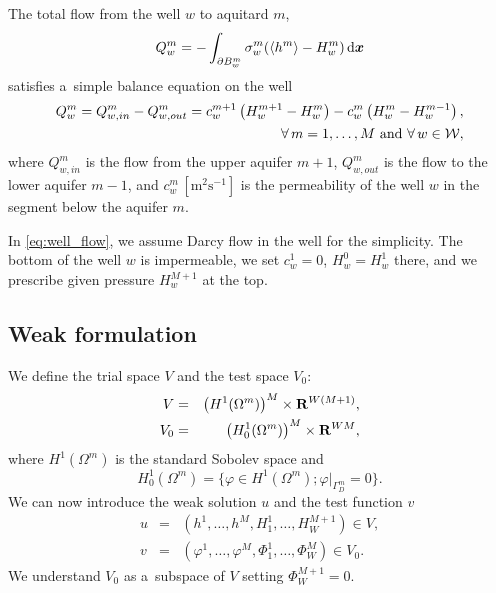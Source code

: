 \documentclass[dvipsnames,FM,Dis]{tulthesis}
\begin{document}
The total flow from the well $w$ to aquitard $m$,
\[
    Q^m_w =-\int_{\partial B^m_w} \sigma^m_w(\langle h^m \rangle - H^m_w)  \,{\rm d}\mathbf{\boldsymbol{x}}
\]
satisfies a~simple balance equation on the well
\begin{align}
    \label{eq:well_flow}
    Q_w^m = Q^m_{w,in} - Q^m_{w,out} = c^{m+1}_w\left( H^{m+1}_w-H^m_w \right) - c_w^m\left( H^m_w-H_w^{m-1}\right),&\\
    \notag
    \forall\,m=1,\dots,M\text{ and }\forall\,w\in\mathcal{W},&
\end{align}
where $Q^m_{w,in}$ is the flow from the upper aquifer $m+1$, $Q^m_{w,out}$ is the flow to the lower aquifer $m-1$, and 
$c^m_w\, [\textrm{m}^2\textrm{s}^{-1}]$ is the permeability of the well $w$ in the segment below the aquifer $m$.

%
In \eqref{eq:well_flow}, we assume Darcy flow in the well for the simplicity. The bottom of the well $w$ is impermeable,
we set $c^1_w=0$, $H^0_w=H^1_w$ there, and we prescribe given pressure $H^{M+1}_w$ at the top.


\subsection{Weak formulation}
We define the trial space $V$ and the test space $V_0$:
\begin{eqnarray} \label{eqn:spaces}
  V &=& \left(H^1(\Omega^m)\right)^M\times{\rm\bf R}^{W(M+1)}, \\
  V_0 &=& \left(H^1_0(\Omega^m)\right)^M\times{\rm\bf R}^{WM},
\end{eqnarray}
where $H^1(\Omega^m)$ is the standard Sobolev space and 
\[ H^1_0(\Omega^m)=\{\varphi\in H^1(\Omega^m); \varphi|_{\Gamma^m_D}=0\}. \]
We can now introduce the weak solution $u$ and the test function $v$
\begin{eqnarray} \label{eqn:solution}
   u &=& (h^1,\ldots, h^M, H^1_1,\ldots,H^{M+1}_W)\in V, \\
   v &=& (\varphi^1,\ldots, \varphi^M, \Phi^1_1,\ldots,\Phi^M_W)\in V_0.
\end{eqnarray}
We understand $V_0$ as a~subspace of $V$ setting $\Phi^{M+1}_W=0$.
\end{document}
